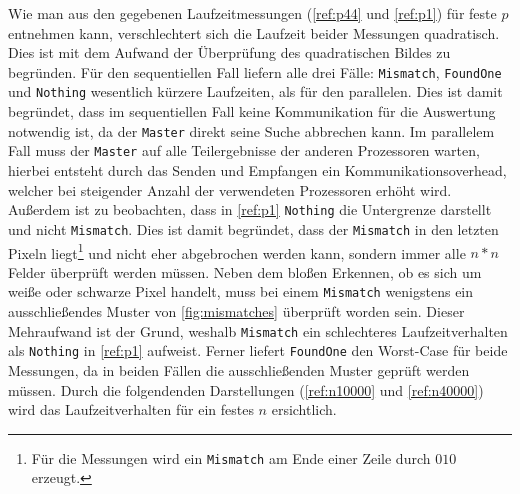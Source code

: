 Wie man aus den gegebenen Laufzeitmessungen (\autoref{ref:p44} und \autoref{ref:p1}) für feste $p$ entnehmen kann, verschlechtert sich die Laufzeit beider Messungen quadratisch.
Dies ist mit dem Aufwand der Überprüfung des quadratischen Bildes zu begründen.
Für den sequentiellen Fall liefern alle drei Fälle: \texttt{Mismatch}, \texttt{FoundOne} und \texttt{Nothing} wesentlich kürzere Laufzeiten, als für den parallelen. 
Dies ist damit begründet, dass im sequentiellen Fall keine Kommunikation für die Auswertung notwendig ist, da der \texttt{Master} direkt seine Suche abbrechen kann. 
Im parallelem Fall muss der \texttt{Master} auf alle Teilergebnisse der anderen Prozessoren warten, hierbei entsteht durch das Senden und Empfangen ein Kommunikationsoverhead, welcher bei steigender Anzahl der verwendeten Prozessoren erhöht wird.
Außerdem ist zu beobachten, dass in \autoref{ref:p1} \texttt{Nothing} die Untergrenze darstellt und nicht \texttt{Mismatch}. Dies ist damit begründet, dass der \texttt{Mismatch} in den letzten Pixeln liegt\footnote{Für die Messungen wird ein \texttt{Mismatch} am Ende einer Zeile durch $0 1 0$ erzeugt.} und nicht eher abgebrochen werden kann, sondern immer alle $n*n$ Felder überprüft werden müssen. 
Neben dem bloßen Erkennen, ob es sich um weiße oder schwarze Pixel handelt, muss bei einem \texttt{Mismatch} wenigstens ein ausschließendes Muster von \autoref{fig:mismatches} überprüft worden sein.
Dieser Mehraufwand ist der Grund, weshalb \texttt{Mismatch} ein schlechteres Laufzeitverhalten als \texttt{Nothing} in \autoref{ref:p1} aufweist.
Ferner liefert \texttt{FoundOne} den Worst-Case für beide Messungen, da in beiden Fällen die ausschließenden Muster geprüft werden müssen. 
Durch die folgendenden Darstellungen (\autoref{ref:n10000} und \autoref{ref:n40000}) wird das Laufzeitverhalten für ein festes $n$ ersichtlich.
